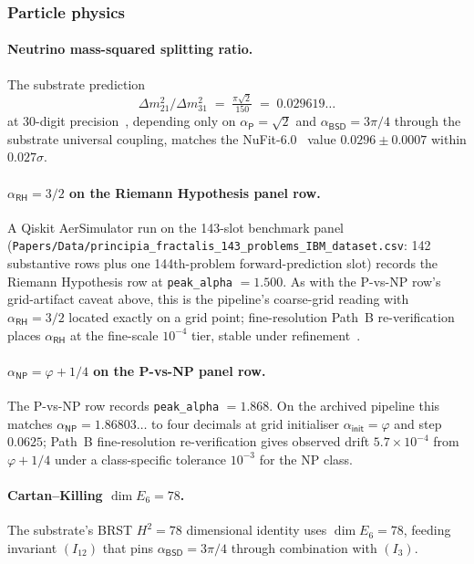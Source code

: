 \documentclass[11pt,a4paper]{amsart}
\theoremstyle{plain}
\theoremstyle{definition}
\begin{document}
\subsubsection*{Particle physics}

\paragraph{Neutrino mass-squared splitting ratio.} The substrate prediction
\[
\Delta m^2_{21} / \Delta m^2_{31} \;=\; \tfrac{\pi \sqrt{2}}{150} \;=\; 0.029619\ldots
\]
at 30-digit precision~\cite{cohen2026book}, depending only on $\alpha_{\textsf{P}} = \sqrt{2}$ and $\alpha_{\textsf{BSD}} = 3\pi/4$ through the substrate universal coupling, matches the NuFit-6.0~\cite{nufit-6.0} value $0.0296 \pm 0.0007$ within $0.027\sigma$.

\paragraph{$\alpha_{\textsf{RH}} = 3/2$ on the Riemann Hypothesis panel row.} A Qiskit AerSimulator run on the 143-slot benchmark panel (\texttt{Papers/Data/principia\_fractalis\_143\_problems\_IBM\_dataset.csv}: 142 substantive rows plus one 144th-problem forward-prediction slot) records the Riemann Hypothesis row at \texttt{peak\_alpha} $= 1.500$. As with the P-vs-NP row's grid-artifact caveat above, this is the pipeline's coarse-grid reading with $\alpha_{\textsf{RH}} = 3/2$ located exactly on a grid point; fine-resolution Path~B re-verification places $\alpha_{\textsf{RH}}$ at the fine-scale $10^{-4}$ tier, stable under refinement~\cite{cohen2026corroborating}.

\paragraph{$\alpha_{\textsf{NP}} = \varphi + 1/4$ on the P-vs-NP panel row.} The P-vs-NP row records \texttt{peak\_alpha} $= 1.868$. On the archived pipeline this matches $\alpha_{\textsf{NP}} = 1.86803\ldots$ to four decimals at grid initialiser $\alpha_{\textsf{init}} = \varphi$ and step $0.0625$; Path~B fine-resolution re-verification gives observed drift $5.7 \times 10^{-4}$ from $\varphi + 1/4$ under a class-specific tolerance $10^{-3}$ for the NP class.

\paragraph{Cartan--Killing $\dim E_6 = 78$.} The substrate's BRST $H^2 = 78$ dimensional identity uses $\dim E_6 = 78$, feeding invariant $(I_{12})$ that pins $\alpha_{\textsf{BSD}} = 3\pi/4$ through combination with $(I_3)$.
\end{document}
